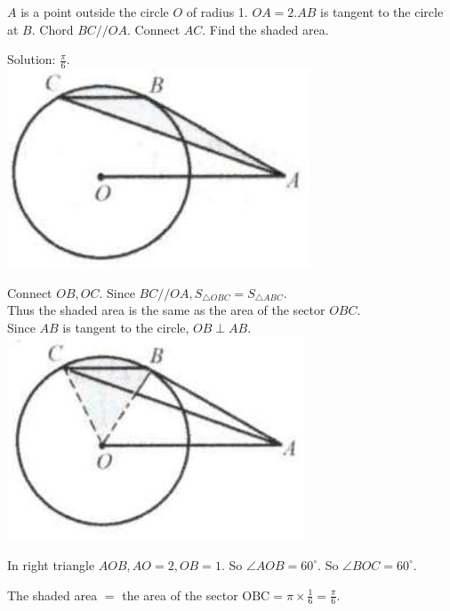 \documentclass{article}
\begin{document}
\(A\) is a point outside the circle \(O\) of radius 1. \(O A=2 . A B\) is tangent to the circle at \(B\). Chord \(B C / / O A\). Connect \(A C\). Find the shaded area.

Solution: \(\frac{\pi}{6}\).\\
\centering
\includegraphics[width=\textwidth]{images/151(1).jpg}

Connect \(O B, O C\). Since \(B C / / O A, S_{\triangle O B C}=S_{\triangle A B C}\).\\
Thus the shaded area is the same as the area of the sector \(O B C\).\\
Since \(A B\) is tangent to the circle, \(O B \perp A B\).\\
\centering
\includegraphics[width=\textwidth]{images/151(3).jpg}

In right triangle \(A O B, A O=2, O B=1\). So \(\angle A O B=60^{\circ}\). So \(\angle B O C=60^{\circ}\).


The shaded area \(=\) the area of the sector \(\mathrm{OBC}=\pi \times \frac{1}{6}=\frac{\pi}{6}\).\\
\end{document}
